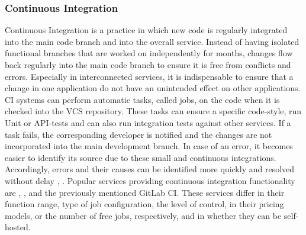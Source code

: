         \subsubsection{Continuous Integration}
        Continuous Integration is a practice in which new code is regularly integrated into the main code branch and into the overall service. Instead of having isolated functional branches that are worked on independently for months, changes flow back regularly into the main code branch to ensure it is free from conflicts and errors. Especially in interconnected services, it is indispensable to ensure that a change in one application do not have an unintended effect on other applications. \ac{CI} systems can perform automatic tasks, called jobs, on the code when it is checked into the \ac{VCS} repository. These tasks can ensure a specific code-style, run Unit or \acs{API}-tests and can also run integration tests against other services. If a task fails, the corresponding developer is notified and the changes are not incorporated into the main development branch. In case of an error, it becomes easier to identify its source due to these small and continuous integrations. Accordingly, errors and their causes can be identified more quickly and resolved without delay \cite{azuredevops}, \cite{base_devops}.\newline
        Popular services providing continuous integration functionality are , ,  and the previously mentioned GitLab \ac{CI}. These services differ in their function range, type of job configuration, the level of control, in their pricing models, or the number of free jobs, respectively, and in whether they can be self-hosted.

